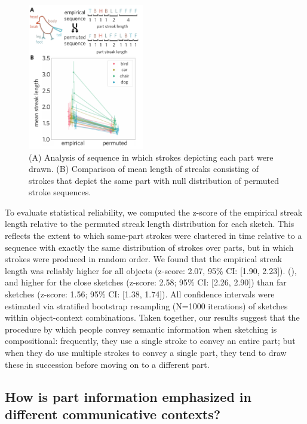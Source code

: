 \documentclass[10pt,letterpaper]{article}
\newcommand{\jefan}[1]{{\color{blue}{[jefan: #1]}}}
\begin{document}
\begin{figure}[ht]
\centering
\includegraphics[width=0.45\textwidth]{figures/6_part_sequence.pdf}
\caption{(A) Analysis of sequence in which strokes depicting each part were drawn. (B) Comparison of mean length of streaks consisting of strokes that depict the same part with null distribution of permuted stroke sequences.}
\label{stroke_sequence_fig}
\end{figure}


To evaluate statistical reliability, we computed the z-score of the empirical streak length relative to the permuted streak length distribution for each sketch. 
This reflects the extent to which same-part strokes were clustered in time relative to a sequence with exactly the same distribution of strokes over parts, but in which strokes were produced in random order. 
We found that the empirical streak length was reliably higher for all objects (z-score: 2.07, 95\% CI: [1.90, 2.23]).
 (\jefan{we need a stat for this, like a p-value reflecting the number of times the permuted streak length exceeded the empirical. If this never happened, then we can say ps < 0.001.}), and higher for the close sketches (z-score: 2.58; 95\% CI: [2.26, 2.90]) than far sketches (z-score: 1.56; 95\% CI: [1.38, 1.74]).  
All confidence intervals were estimated via stratified bootstrap resampling (N=1000 iterations) of sketches within object-context combinations.
Taken together, our results suggest that the procedure by which people convey semantic information when sketching is compositional: frequently, they use a single stroke to convey an entire part; but when they do use multiple strokes to convey a single part, they tend to draw these in succession before moving on to a different part. 

\subsection{How is part information emphasized in different communicative contexts?}
\end{document}
